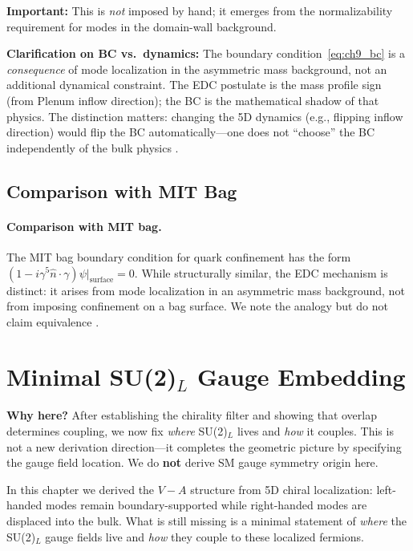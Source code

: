 \textbf{Important:} This is \emph{not} imposed by hand; it emerges from the
normalizability requirement for modes in the domain-wall background.

\textbf{Clarification on BC vs.\ dynamics:} The boundary condition~\eqref{eq:ch9_bc}
is a \emph{consequence} of mode localization in the asymmetric mass background, not
an additional dynamical constraint. The EDC postulate is the mass profile sign
(from Plenum inflow direction); the BC is the mathematical shadow of that physics.
The distinction matters: changing the 5D dynamics (e.g., flipping inflow direction)
would flip the BC automatically---one does not ``choose'' the BC independently of
the bulk physics \tagDc{}.

\subsection{Comparison with MIT Bag}

\paragraph{Comparison with MIT bag.}
The MIT bag boundary condition for quark confinement has the form
$(1 - i\gamma^5 \hat{n} \cdot \gamma)\psi|_{\text{surface}} = 0$.
While structurally similar, the EDC mechanism is distinct: it arises from
mode localization in an asymmetric mass background, not from imposing
confinement on a bag surface. We note the analogy but do not claim equivalence \tagI{}.

\section{\texorpdfstring{Minimal SU(2)$_L$ Gauge Embedding}{Minimal SU(2)L Gauge Embedding}}
\label{sec:ch9_su2_embedding}

\textbf{Why here?} After establishing the chirality filter and showing that overlap
determines coupling, we now fix \emph{where} SU(2)$_L$ lives and \emph{how} it couples.
This is not a new derivation direction---it completes the geometric picture by specifying
the gauge field location. We do \textbf{not} derive SM gauge symmetry origin here.

\medskip

In this chapter we derived the $V{-}A$ structure from 5D chiral localization:
left-handed modes remain boundary-supported while right-handed modes are displaced
into the bulk. What is still missing is a minimal statement of \emph{where} the
SU(2)$_L$ gauge fields live and \emph{how} they couple to these localized fermions.

